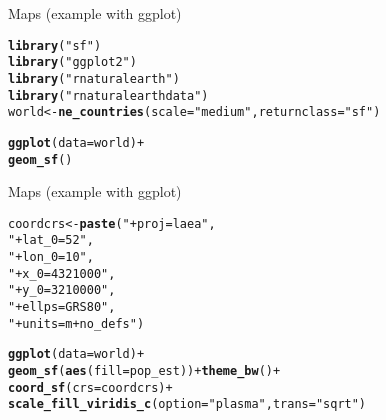 \documentclass[10pt]{beamer}\usepackage[]{graphicx}\usepackage[]{color}
\makeatletter
\newcommand{\hlstr}[1]{\textcolor[rgb]{0.192,0.494,0.8}{#1}}%
\newcommand{\hlopt}[1]{\textcolor[rgb]{0,0,0}{#1}}%
\newcommand{\hlstd}[1]{\textcolor[rgb]{0.345,0.345,0.345}{#1}}%
\newcommand{\hlkwb}[1]{\textcolor[rgb]{0.69,0.353,0.396}{#1}}%
\newcommand{\hlkwc}[1]{\textcolor[rgb]{0.333,0.667,0.333}{#1}}%
\newcommand{\hlkwd}[1]{\textcolor[rgb]{0.737,0.353,0.396}{\textbf{#1}}}%
\newenvironment{kframe}{%
 \def\at@end@of@kframe{}%
 \ifinner\ifhmode%
  \def\at@end@of@kframe{\end{minipage}}%
  \begin{minipage}{\columnwidth}%
 \fi\fi%
 \def\FrameCommand##1{\hskip\@totalleftmargin \hskip-\fboxsep
 \colorbox{shadecolor}{##1}\hskip-\fboxsep
     \hskip-\linewidth \hskip-\@totalleftmargin \hskip\columnwidth}%
 \MakeFramed {\advance\hsize-\width
   \@totalleftmargin\z@ \linewidth\hsize
   \@setminipage}}%
 {\par\unskip\endMakeFramed%
 \at@end@of@kframe}
\newenvironment{knitrout}{}{} %
\makeatother
\begin{document}
\begin{frame}[fragile]{Maps (example with ggplot)}
\begin{knitrout}
\color{fgcolor}\begin{kframe}
\begin{alltt}
\hlkwd{library}\hlstd{(}\hlstr{"sf"}\hlstd{)}
\hlkwd{library}\hlstd{(}\hlstr{"ggplot2"}\hlstd{)}
\hlkwd{library}\hlstd{(}\hlstr{"rnaturalearth"}\hlstd{)}
\hlkwd{library}\hlstd{(}\hlstr{"rnaturalearthdata"}\hlstd{)}
\hlstd{world} \hlkwb{<-} \hlkwd{ne_countries}\hlstd{(}\hlkwc{scale} \hlstd{=} \hlstr{"medium"}\hlstd{,} \hlkwc{returnclass} \hlstd{=} \hlstr{"sf"}\hlstd{)}

\hlkwd{ggplot}\hlstd{(}\hlkwc{data} \hlstd{= world)} \hlopt{+}
    \hlkwd{geom_sf}\hlstd{()}
\end{alltt}
\end{kframe}
\end{knitrout}
\end{frame}

\begin{frame}[fragile]{Maps (example with ggplot)}
\begin{knitrout}
\color{fgcolor}\begin{kframe}
\begin{alltt}
\hlstd{coordcrs} \hlkwb{<-} \hlkwd{paste}\hlstd{(}\hlstr{"+proj=laea"}\hlstd{,}
                   \hlstr{"+lat_0=52"}\hlstd{,}
                    \hlstr{"+lon_0=10"}\hlstd{,}
                  \hlstr{"+x_0=4321000"}\hlstd{,}
                  \hlstr{"+y_0=3210000"}\hlstd{,}
                  \hlstr{"+ellps=GRS80"}\hlstd{,}
                  \hlstr{"+units=m +no_defs"}\hlstd{)}

\hlkwd{ggplot}\hlstd{(}\hlkwc{data} \hlstd{= world)} \hlopt{+}
    \hlkwd{geom_sf}\hlstd{(}\hlkwd{aes}\hlstd{(}\hlkwc{fill} \hlstd{= pop_est))} \hlopt{+} \hlkwd{theme_bw}\hlstd{()}\hlopt{+}
    \hlkwd{coord_sf}\hlstd{(}\hlkwc{crs} \hlstd{=coordcrs)}\hlopt{+}
  \hlkwd{scale_fill_viridis_c}\hlstd{(}\hlkwc{option} \hlstd{=} \hlstr{"plasma"}\hlstd{,} \hlkwc{trans} \hlstd{=} \hlstr{"sqrt"}\hlstd{)}
\end{alltt}
\end{kframe}
\end{knitrout}

\end{frame}
\end{document}
